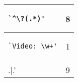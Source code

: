 \begin{table}
\begin{small}
\begin{center}
\begin{tabular}{lc}
\begin{minipage}{2.4in}
\begin{verbatim}
`^\?(.*)'\end{verbatim}
\end{minipage}
& 8 \\ 
\midrule
\begin{minipage}{2.4in}
\begin{verbatim}
`Video: \w+'\end{verbatim}
\end{minipage}
& 1 \\ 
\midrule
\begin{minipage}{2.4in}
\begin{verbatim}
`\\.|.'\end{verbatim}
\end{minipage}
& 9 \\ 
\bottomrule
\end{tabular}
\end{center}
\end{small}
\end{table}
